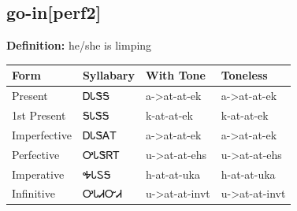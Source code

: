 \documentclass{article}%
\begin{document}
\subsection*{go-in[perf2]}%
\textbf{Definition: }%
he/she is limping%
\\[0.5em]%
\begin{tabular}{|l|l|l|l|}%
\hline%
\textbf{Form}&\textbf{Syllabary}&\textbf{With Tone}&\textbf{Toneless}\\%
\hline%
Present&ᎠᏓᏕᎦ&a{-}>at{-}at{-}ek&a{-}>at{-}at{-}ek\\%
1st Present&ᎦᏓᏕᎦ&k{-}at{-}at{-}ek&k{-}at{-}at{-}ek\\%
Imperfective&ᎠᏓᏕᎪᎢ&a{-}>at{-}at{-}ek&a{-}>at{-}at{-}ek\\%
Perfective&ᎤᏓᏕᏒᎢ&u{-}>at{-}at{-}ehs&u{-}>at{-}at{-}ehs\\%
Imperative&ᎭᏓᏚᎦ&h{-}at{-}at{-}uka&h{-}at{-}at{-}uka\\%
Infinitive&ᎤᏓᏗᏅᏗ&u{-}>at{-}at{-}invt&u{-}>at{-}at{-}invt\\%
\hline%
\end{tabular}%
\\[1em]%
\end{document}
